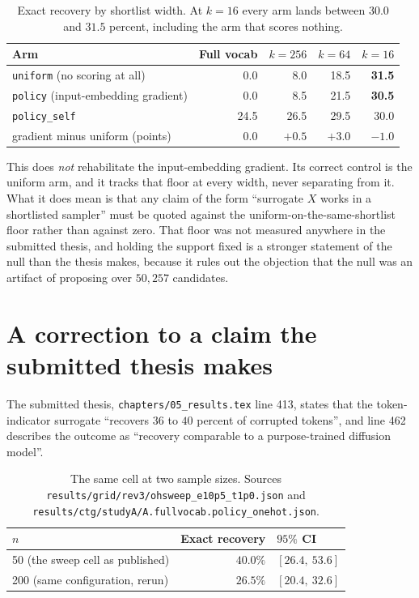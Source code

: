 \documentclass[11pt,a4paper]{article}
\newcommand{\file}[1]{\texttt{\small #1}}
\begin{document}
\begin{table}[htbp]
\centering
\begin{tabular}{lrrrr}
\toprule
Arm & Full vocab & $k=256$ & $k=64$ & $k=16$ \\
\midrule
\texttt{uniform} (no scoring at all) & 0.0 & 8.0 & 18.5 & \textbf{31.5} \\
\texttt{policy} (input-embedding gradient) & 0.0 & 8.5 & 21.5 & \textbf{30.5} \\
\texttt{policy\_self} & 24.5 & 26.5 & 29.5 & 30.0 \\
\midrule
gradient minus uniform (points) & 0.0 & $+0.5$ & $+3.0$ & $-1.0$ \\
\bottomrule
\end{tabular}
\caption{Exact recovery by shortlist width. At $k=16$ every arm lands between $30.0$ and
$31.5$ percent, including the arm that scores nothing.}
\end{table}

This does \emph{not} rehabilitate the input-embedding gradient. Its correct control is
the uniform arm, and it tracks that floor at every width, never separating from it. What
it does mean is that any claim of the form ``surrogate $X$ works in a shortlisted
sampler'' must be quoted against the uniform-on-the-same-shortlist floor rather than
against zero. That floor was not measured anywhere in the submitted thesis, and holding
the support fixed is a stronger statement of the null than the thesis makes, because it
rules out the objection that the null was an artifact of proposing over $50{,}257$
candidates.

\section{A correction to a claim the submitted thesis makes}
\label{sec:contradiction}

The submitted thesis, \file{chapters/05\_results.tex} line 413, states that the
token-indicator surrogate ``recovers $36$ to $40$ percent of corrupted tokens'', and
line 462 describes the outcome as ``recovery comparable to a purpose-trained diffusion
model''.

\begin{table}[htbp]
\centering
\begin{tabular}{lrl}
\toprule
$n$ & Exact recovery & $95\%$ CI \\
\midrule
50 (the sweep cell as published) & $40.0\%$ & $[26.4,\ 53.6]$ \\
200 (same configuration, rerun) & $\bm{26.5\%}$ & $[20.4,\ 32.6]$ \\
\bottomrule
\end{tabular}
\caption{The same cell at two sample sizes. Sources
\file{results/grid/rev3/ohsweep\_e10p5\_t1p0.json} and
\file{results/ctg/studyA/A.fullvocab.policy\_onehot.json}.}
\end{table}
\end{document}
